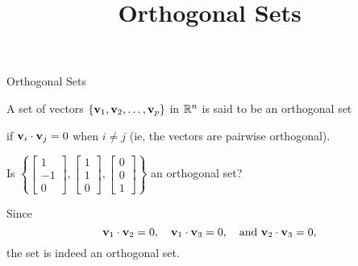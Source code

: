 \documentclass[xcolor=dvipsnames,aspectratio=169,t]{beamer}
\title{Orthogonal Sets}
\begin{document}
\maketitle

\begin{frame}{Orthogonal Sets}
  \begin{definition}
    A set of vectors $\left\{ \mathbf{v}_1, \mathbf{v}_2, \ldots , \mathbf{v}_p \right\}$ in $\mathbb{R}^n$ is said to be an \alert{orthogonal set} 

    \quad if $\mathbf{v}_i \cdot \mathbf{v}_j =0$ when $i \ne j$ (ie, the vectors are pairwise orthogonal).
  \end{definition}
  \medskip

  \begin{example}
  Is $\left\{ \begin{bmatrix} 1 \\ -1 \\ 0 \end{bmatrix}, \begin{bmatrix} 1 \\ 1 \\ 0 \end{bmatrix}, \begin{bmatrix} 0 \\ 0 \\ 1 \end{bmatrix} \right\}$ an orthogonal set?
  \end{example}
  \medskip

  \pause
  Since
  \[ \mathbf{v}_1 \cdot \mathbf{v}_2 = 0 , \quad \mathbf{v}_1 \cdot \mathbf{v}_3 = 0, \quad \mbox{and } \mathbf{v}_2 \cdot \mathbf{v}_3 = 0 ,\]
  the set is indeed an orthogonal set.
\end{frame}
\end{document}
